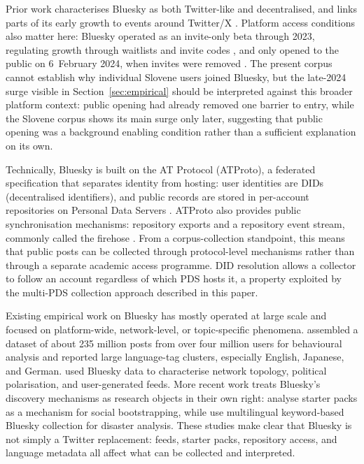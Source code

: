 Prior work characterises Bluesky as both Twitter-like and decentralised, and links parts of its early growth to events around Twitter/X \parencite{failla2024bluesky,quelle2025bluesky}. Platform access conditions also matter here: Bluesky operated as an invite-only beta through 2023, regulating growth through waitlists and invite codes \parencite{bsky-beta-2023,bsky-beta-roadmap-2023}, and only opened to the public on 6~February 2024, when invites were removed \parencite{bsky-public-2024}. The present corpus cannot establish why individual Slovene users joined Bluesky, but the late-2024 surge visible in Section~\ref{sec:empirical} should be interpreted against this broader platform context: public opening had already removed one barrier to entry, while the Slovene corpus shows its main surge only later, suggesting that public opening was a background enabling condition rather than a sufficient explanation on its own.

Technically, Bluesky is built on the AT Protocol (ATProto), a federated specification that separates identity from hosting: user identities are DIDs (decentralised identifiers), and public records are stored in per-account repositories on Personal Data Servers \parencite{kleppmann2024atproto,atproto-spec,atproto-repository}. ATProto also provides public synchronisation mechanisms: repository exports and a repository event stream, commonly called the firehose \parencite{atproto-sync,atproto-streaming}. From a corpus-collection standpoint, this means that public posts can be collected through protocol-level mechanisms rather than through a separate academic access programme. DID resolution allows a collector to follow an account regardless of which PDS hosts it, a property exploited by the multi-PDS collection approach described in this paper.

Existing empirical work on Bluesky has mostly operated at large scale and focused on platform-wide, network-level, or topic-specific phenomena. \textcite{failla2024bluesky} assembled a dataset of about 235 million posts from over four million users for behavioural analysis and reported large language-tag clusters, especially English, Japanese, and German. \textcite{quelle2025bluesky} used Bluesky data to characterise network topology, political polarisation, and user-generated feeds. More recent work treats Bluesky's discovery mechanisms as research objects in their own right: \textcite{balduf2025starterpacks} analyse starter packs as a mechanism for social bootstrapping, while \textcite{hanny2026disaster} use multilingual keyword-based Bluesky collection for disaster analysis. These studies make clear that Bluesky is not simply a Twitter replacement: feeds, starter packs, repository access, and language metadata all affect what can be collected and interpreted.


